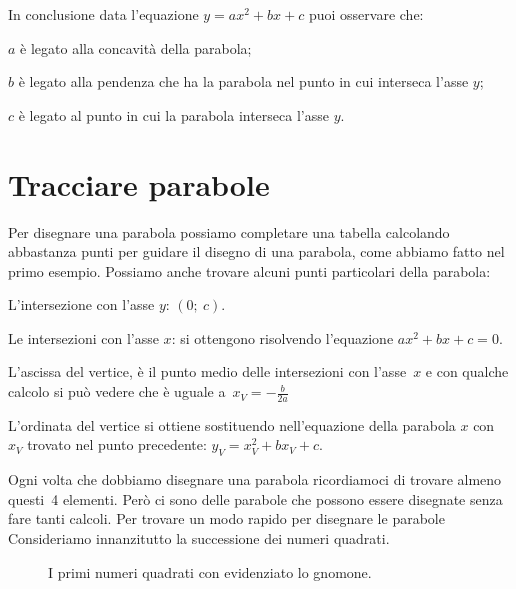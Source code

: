 In conclusione data l'equazione $y=ax^2+bx+c$ puoi osservare che:
\begin{enumerate*}
 \item $a$ è legato alla concavità della parabola;
 \item $b$ è legato alla pendenza che ha la parabola nel punto in cui 
  interseca l'asse $y$;
 \item $c$ è legato al punto in cui la parabola interseca l'asse $y$.
\end{enumerate*}


\section{Tracciare parabole}
\label{sec:parabola_disegno}

Per disegnare una parabola possiamo completare una tabella calcolando 
abbastanza punti per guidare il disegno di una parabola, come abbiamo fatto
nel primo esempio.
Possiamo anche trovare alcuni punti particolari della parabola:

\begin{enumerate*}
 \item L'intersezione con l'asse $y$: $(0;~c)$.
 \item Le intersezioni con l'asse $x$: si ottengono risolvendo l'equazione
  $ax^2+bx+c=0$.
 \item L'ascissa del vertice, è il punto medio delle intersezioni con 
  l'asse~$x$ e con qualche calcolo si può vedere che è uguale 
  a~$x_V=-\frac{b}{2a}$
 \item L'ordinata del vertice si ottiene sostituendo nell'equazione della 
  parabola $x$ con $x_V$ trovato nel punto precedente: $y_V=x_V^2+bx_V+c$.
\end{enumerate*}

Ogni volta che dobbiamo disegnare una parabola ricordiamoci di trovare almeno
questi~4 elementi. Però ci sono delle parabole che possono essere disegnate 
senza fare tanti calcoli. Per trovare un modo rapido per disegnare le parabole 
Consideriamo innanzitutto la successione dei numeri quadrati.

 \begin{inaccessibleblock}
\begin{figure}
  
  \caption{I primi numeri quadrati con evidenziato lo gnomone.}
  \label{fig:parabola_quadrati}
\end{figure}
\end{inaccessibleblock}


